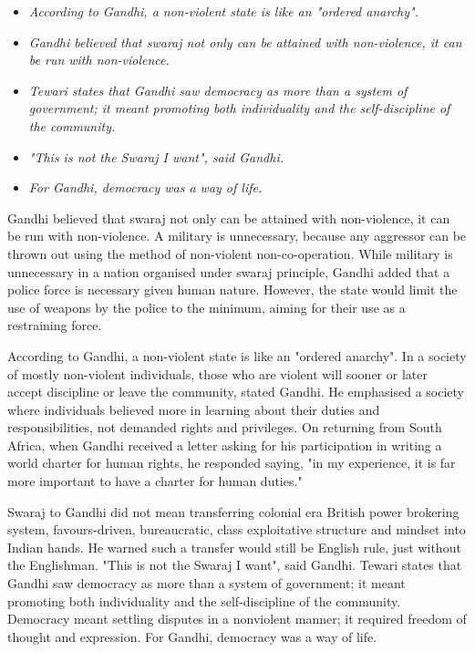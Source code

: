 \begin{itemize}
\item
  \emph{According to Gandhi, a non-violent state is like an "ordered
  anarchy".}
\item
  \emph{Gandhi believed that swaraj not only can be attained with
  non-violence, it can be run with non-violence.}
\item
  \emph{Tewari states that Gandhi saw democracy as more than a system of
  government; it meant promoting both individuality and the
  self-discipline of the community.}
\item
  \emph{"This is not the Swaraj I want", said Gandhi.}
\item
  \emph{For Gandhi, democracy was a way of life.}
\end{itemize}

Gandhi believed that swaraj not only can be attained with non-violence,
it can be run with non-violence. A military is unnecessary, because any
aggressor can be thrown out using the method of non-violent
non-co-operation. While military is unnecessary in a nation organised
under swaraj principle, Gandhi added that a police force is necessary
given human nature. However, the state would limit the use of weapons by
the police to the minimum, aiming for their use as a restraining force.

According to Gandhi, a non-violent state is like an "ordered anarchy".
In a society of mostly non-violent individuals, those who are violent
will sooner or later accept discipline or leave the community, stated
Gandhi. He emphasised a society where individuals believed more in
learning about their duties and responsibilities, not demanded rights
and privileges. On returning from South Africa, when Gandhi received a
letter asking for his participation in writing a world charter for human
rights, he responded saying, "in my experience, it is far more important
to have a charter for human duties."

Swaraj to Gandhi did not mean transferring colonial era British power
brokering system, favours-driven, bureaucratic, class exploitative
structure and mindset into Indian hands. He warned such a transfer would
still be English rule, just without the Englishman. "This is not the
Swaraj I want", said Gandhi. Tewari states that Gandhi saw democracy as
more than a system of government; it meant promoting both individuality
and the self-discipline of the community. Democracy meant settling
disputes in a nonviolent manner; it required freedom of thought and
expression. For Gandhi, democracy was a way of life.

